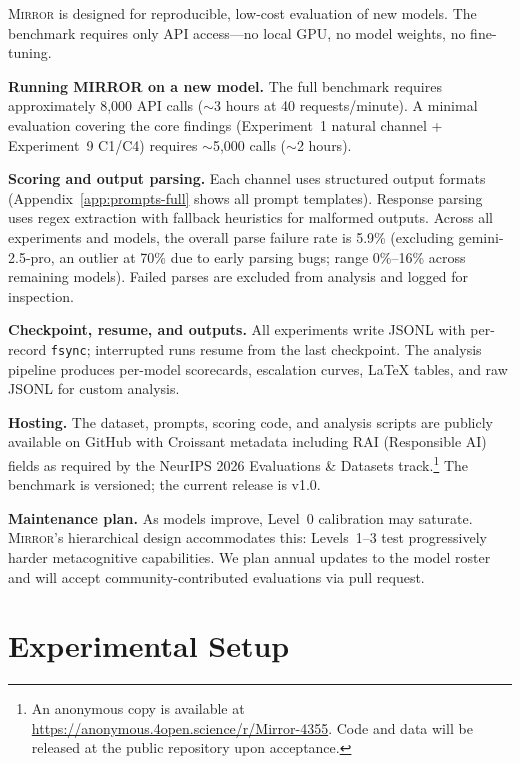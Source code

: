 \documentclass[10pt]{article}
\newcommand{\mirror}{\textsc{Mirror}}
\begin{document}
\mirror{} is designed for reproducible, low-cost evaluation of new models. The
benchmark requires only API access---no local GPU, no model weights, no fine-tuning.

\textbf{Running MIRROR on a new model.} The full benchmark requires approximately
8,000 API calls ($\sim$3 hours at 40 requests/minute). A minimal evaluation
covering the core findings (Experiment~1 natural channel + Experiment~9 C1/C4)
requires $\sim$5,000 calls ($\sim$2 hours).

\textbf{Scoring and output parsing.} Each channel uses structured output formats
(Appendix~\ref{app:prompts-full} shows all prompt templates). Response parsing uses
regex extraction with fallback heuristics for malformed outputs. Across all experiments and models, the overall parse failure rate is 5.9\%
(excluding gemini-2.5-pro, an outlier at 70\% due to early parsing bugs; range
0\%--16\% across remaining models). Failed parses are excluded from analysis and
logged for inspection.

\textbf{Checkpoint, resume, and outputs.} All experiments write JSONL with
per-record \texttt{fsync}; interrupted runs resume from the last checkpoint.
The analysis pipeline produces per-model scorecards, escalation curves,
LaTeX tables, and raw JSONL for custom analysis.

\textbf{Hosting.} The dataset, prompts, scoring code, and analysis scripts are
publicly available on GitHub with Croissant metadata including RAI
(Responsible AI) fields as required by the NeurIPS 2026 Evaluations \& Datasets
track.\footnote{An anonymous copy is available at \url{https://anonymous.4open.science/r/Mirror-4355}. Code and data will be released at the public repository upon acceptance.} The benchmark is versioned;
the current release is v1.0.

\textbf{Maintenance plan.} As models improve, Level~0 calibration may saturate.
\mirror{}'s hierarchical design accommodates this: Levels~1--3 test progressively
harder metacognitive capabilities. We plan annual updates to the model roster and
will accept community-contributed evaluations via pull request.

\section{Experimental Setup}
\label{sec:setup}
\end{document}
